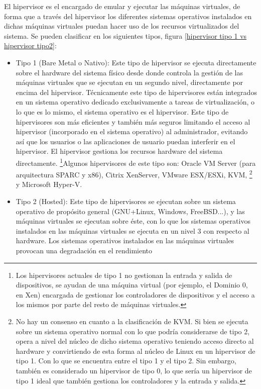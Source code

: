 \documentclass[spanisheDIVcalc,twoside,parskip-,pointlessnumbers,final]{scrbook}
\begin{document}
El hipervisor es el encargado de emular y ejecutar las máquinas virtuales,
de forma que a través del hipervisor los diferentes sistemas operativos
instalados en dichas máquinas virtuales puedan hacer uso de los recursos
virtualizados del sistema. Se pueden clasificar en los siguientes
tipos, figura \ref{hipervisor tipo 1 vs hipervisor tipo2}:
\begin{itemize}
\item Tipo 1 (Bare Metal o Nativo): Este tipo de hipervisor se ejecuta directamente
sobre el hardware del sistema físico desde donde controla la gestión
de las máquinas virtuales que se ejecutan en un segundo nivel, directamente
por encima del hipervisor. Técnicamente este tipo de hipervisores
están integrados en un sistema operativo dedicado exclusivamente a
tareas de virtualización, o lo que es lo mismo, el sistema operativo
es el hipervisor. Este tipo de hipervisores son más eficientes y también
más seguros limitando el acceso al hipervisor (incorporado en el sistema
operativo) al administrador, evitando así que los usuarios o las aplicaciones
de usuario puedan interferir en el hipervisor. El hipervisor gestiona
los recursos hardware del sistema directamente.%
\footnote{Los hipervisores actuales de tipo 1 no gestionan la entrada y salida
de dispositivos, se ayudan de una máquina virtual (por ejemplo, el
Dominio 0, en Xen) encargada de gestionar los controladores de dispositivos
y el acceso a los mismos por parte del resto de máquinas virtuales.%
}Algunos hipervisores de este tipo son: Oracle VM Server (para arquitectura
SPARC y x86), Citrix XenServer, VMware ESX/ESXi, KVM,%
\footnote{No hay un consenso en cuanto a la clasificación de KVM. Si bien se
ejecuta sobre un sistema operativo normal con lo que podría considerarse
de tipo 2, opera a nivel del núcleo de dicho sistema operativo teniendo
acceso directo al hardware y convirtiendo de esta forma al núcleo
de Linux en un hipervisor de tipo 1. Con lo que se encuentra entre
el tipo 1 y el tipo 2. Sin embargo, también es considerado un hipervisor
de tipo 0, lo que sería un hipervisor de tipo 1 ideal que también
gestiona los controladores y la entrada y salida.%
} y Microsoft Hyper-V.
\item Tipo 2 (Hosted): Este tipo de hipervisores se ejecutan sobre un sistema
operativo de propósito general (GNU+Linux, Windows, FreeBSD...), y
las máquinas virtuales se ejecutan sobre éste, con lo que los sistemas
operativos instalados en las máquinas virtuales se ejecuta en un nivel
3 con respecto al hardware. Los sistemas operativos instalados en
las máquinas virtuales provocan una degradación en el rendimiento

\end{itemize}
\end{document}
